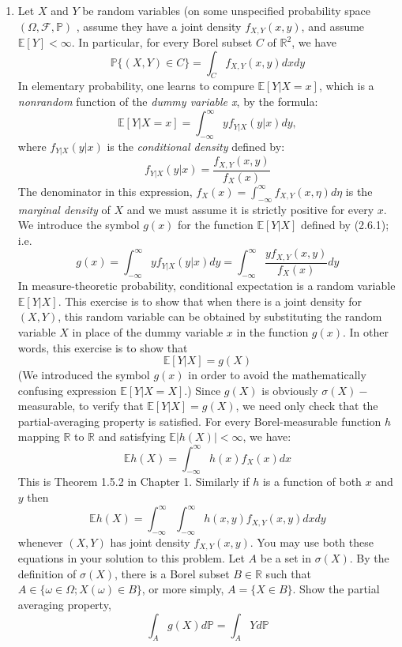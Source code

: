 \documentclass{article}
\makeatletter
\newcommand{\p}{\mathbb{P}}
\newcommand{\R}{\mathbb{R}}
\newcommand{\E}{\mathbb{E}}
\newcommand{\F}{\mathcal{F}}
\newcommand{\pspace}{\left(\Omega,\F,\p\right)}
\newcommand{\abs}[1]{\left| #1 \right|}
\newcommand{\mylabel}[2]{#2\def\@currentlabel{#2}\label{#1}}
\newcommand{\pr}[1]{ \item[\mylabel{}{#1.}]}
\newcommand{\seq}[1]{\{ #1 \}}
\theoremstyle{definition}
\theoremstyle{definition}
\makeatother
\begin{document}
\begin{enumerate}
    \pr{2.10} Let $X$ and $Y$ be random variables (on some unspecified probability space $\pspace$ , assume they have a joint density $f_{X,Y}(x,y)$, and assume $\E[Y]<\infty$. In particular, for every Borel subset $C$ of $\R^2$, we have 
    $$ \p\seq{(X,Y) \in C} = \int_C f_{X,Y} (x,y) dx dy  $$
    In elementary probability, one learns to compure $\E[Y|X=x]$, which is a \textit{nonrandom} function of the \textit{dummy variable x}, by the formula:
    $$ \E[Y|X=x] = \int_{-\infty}^{\infty} yf_{Y|X}(y|x)dy,$$
where $f_{Y|X}(y|x)$ is the \textit{conditional density} defined by:
$$ f_{Y|X}(y|x) = \frac{f_{X,Y}(x,y)}{f_X(x)}$$
The denominator in this expression, $f_X(x)=\int_{-\infty}^{\infty}f_{X,Y}(x,\eta)d\eta$ is the \textit{marginal density} of $X$ and we must assume it is strictly positive for every $x$. We introduce the symbol $g(x)$ for the function $\E[Y|X]$ defined by (2.6.1); i.e.
\begin{equation} g(x) = \int_{-\infty}^{\infty} y f_{Y|X} (y|x) dy = \int_{-\infty}^{\infty}\frac{yf_{X,Y}(x,y)}{f_X(x)}dy \end{equation}
In measure-theoretic probability, conditional expectation is a random variable $\E[Y|X]$. This exercise is to show that when there is a joint density for $(X,Y)$, this random variable can be obtained by substituting the random variable $X$ in place of the dummy variable $x$ in the function $g(x)$. In other words, this exercise is to show that
$$ \E[Y|X] = g(X)$$
(We introduced the symbol $g(x)$ in order to avoid the mathematically confusing expression $\E[Y|X=X]$.)
Since $g(X)$ is obviously $\sigma(X)-$measurable, to verify that $\E[Y|X] = g(X)$, we need only check that the partial-averaging property is satisfied. For every Borel-measurable function $h$ mapping $\R$ to $\R$ and satisfying $\E\abs{h(X)}<\infty$, we have:
\begin{equation} \E h(X) = \int_{-\infty}^{\infty}h(x)f_X(x)dx \end{equation}
This is Theorem 1.5.2 in Chapter 1. Similarly if $h$ is a function of both $x$ and $y$ then
\begin{equation} \E h(X) = \int_{-\infty}^{\infty} \int_{-\infty}^{\infty} h(x,y)f_{X,Y}(x,y)dxdy \end{equation}
whenever $(X,Y)$ has joint density $f_{X,Y}(x,y)$. You may use both these equations in your solution to this problem. 
Let $A$ be a set in $\sigma(X)$. By the definition of $\sigma(X)$, there is a Borel subset $B \in \R$ such that $A \in \seq{\omega \in \Omega; X(\omega) \in B}$, or more simply, $A=\seq{X \in B}$. Show the partial averaging property,
$$ \int_A g(X) d\p = \int_A Y d\p$$


\end{enumerate}
\end{document}
